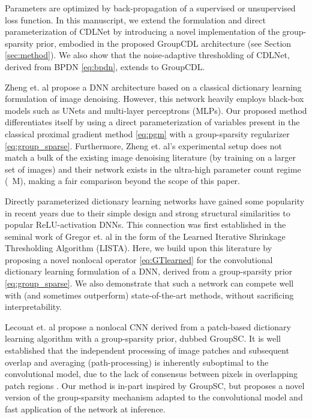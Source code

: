 \documentclass[lettersize,journal]{IEEEtran}
\newcommand{\soa}{state-of-the-art }
\begin{document}
Parameters  are optimized by back-propagation of a supervised or unsupervised loss function. 
In this manuscript, we extend the formulation and direct parameterization of CDLNet by introducing a novel implementation of the group-sparsity prior, embodied in the proposed GroupCDL architecture (see Section \ref{sec:method}). We also show that the noise-adaptive thresholding of CDLNet, derived from BPDN \eqref{eq:bpdn}, extends to GroupCDL.

Zheng et. al \cite{Zheng_2021_CVPR} propose a DNN architecture based on a
classical dictionary learning formulation of image denoising. However, this network heavily employs black-box models such as UNets
\cite{unet} and multi-layer perceptrons (MLPs). Our proposed method
differentiates itself by using a direct parameterization of variables present
in the classical proximal gradient method \eqref{eq:pgm} with a group-sparsity
regularizer \eqref{eq:group_sparse}. Furthermore, Zheng et. al's
experimental setup does not match a bulk of the existing image denoising literature (by training
on a larger set of images) and their network exists in the ultra-high
parameter count regime (~M), making a fair comparison beyond the scope
of this paper.

Directly parameterized dictionary learning networks \cite{janjusevicCDLNet2022, janjusevicGDLNet2022, lecouat2020nonlocal, Sreter2018, Simon2019,
Scetbon2019DeepKD} have gained some popularity in recent years due to their
simple design and strong structural similarities to popular ReLU-activation
DNNs. This connection was first established in
the seminal work of Gregor et. al \cite{Gregor2010} in the form of the Learned
Iterative Shrinkage Thresholding Algorithm (LISTA). Here,
we build upon this literature by proposing a novel nonlocal operator \eqref{eq:GTlearned} for the
convolutional dictionary learning formulation of a DNN, derived from a group-sparsity prior \eqref{eq:group_sparse}. 
We also demonstrate that such a network can compete well with (and sometimes outperform)
\soa methods, without sacrificing interpretability. 

Lecouat et. al \cite{lecouat2020nonlocal} propose a nonlocal CNN derived from a
patch-based dictionary learning algorithm with a group-sparsity prior, dubbed
GroupSC. It is well established that the independent processing of image patches
and subsequent overlap and averaging (path-processing) is inherently suboptimal
to the convolutional model, due to the lack of consensus between pixels in
overlapping patch regions \cite{Simon2019}. Our method is in-part inspired by
GroupSC, but proposes a novel version of the group-sparsity mechanism adapted to
the convolutional model and fast application of the network at inference.
\end{document}
